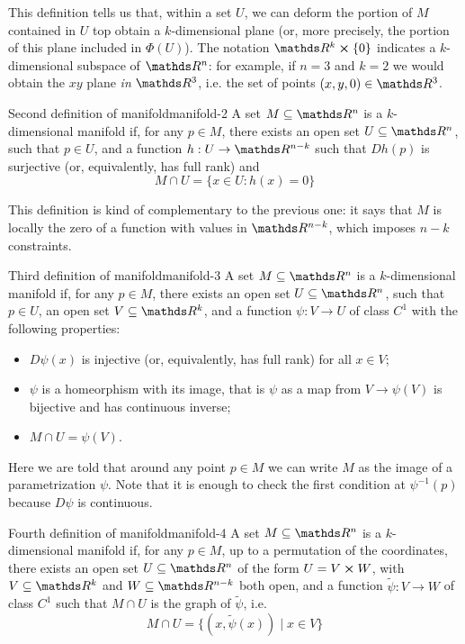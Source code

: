 \documentclass[12pt]{extarticle}
\begin{document}
This definition tells us that, within a set $U$, we can deform the portion of $M$ contained in $U$
top obtain a $k$-dimensional plane (or, more precisely, the portion of this plane included in
$\Phi(U)$).
The notation $\R^k \cross \{0\}$ indicates a $k$-dimensional subspace of $\R^n$: for example, if
$n = 3$ and $k = 2$ we would obtain the $xy$ plane \emph{in} $\R^3$, i.e. the set of points
$(x, y, 0) \in \R^3$.

\begin{definition}{Second definition of manifold}{manifold-2}
	A set $M \subseteq \R^n$ is a $k$-dimensional manifold if, for any $p \in M$, there exists an open
	set $U \subseteq \R^n$, such that $p \in U$, and a function $h: U \to \R^{n-k}$ such that $Dh(p)$
	is surjective (or, equivalently, has full rank) and
	\begin{equation}
		M \cap U = \{ x \in U : h(x) = 0 \}
	\end{equation}
\end{definition}

This definition is kind of complementary to the previous one: it says that $M$ is locally the zero
of a function with values in $\R^{n-k}$, which imposes $n-k$ constraints.

\begin{definition}{Third definition of manifold}{manifold-3}
	A set $M \subseteq \R^n$ is a $k$-dimensional manifold if, for any $p \in M$, there exists an open
	set $U \subseteq \R^n$, such that $p \in U$, an open set $V \subseteq \R^k$, and a function
	$\psi: V \to U$ of class $C^1$ with the following properties:
	\begin{itemize}
		\item $D \psi (x) $ is injective (or, equivalently, has full rank) for all $x \in V$;
		\item $\psi$ is a homeorphism with its image, that is $\psi$ as a map from $V \to \psi(V)$ is
		      bijective and has continuous inverse;
		\item $M \cap U = \psi(V)$.
	\end{itemize}
\end{definition}

Here we are told that around any point $p \in M$ we can write $M$ as the image of a parametrization
$\psi$. Note that it is enough to check the first condition at $\psi^{-1}(p)$ because $D\psi$ is
continuous.

\begin{definition}{Fourth definition of manifold}{manifold-4}
	A set $M \subseteq \R^n$ is a $k$-dimensional manifold if, for any $p \in M$, up to a permutation
	of the coordinates, there exists an open set $U \subseteq \R^n$ of the form $U = V \cross W$, with
	$V \subseteq \R^k$ and $W \subseteq \R^{n - k}$ both open, and a function $\tilde \psi: V \to W$
	of class $C^1$ such that $M \cap U$ is the graph of $\tilde \psi$, i.e.
	\begin{equation}
		M \cap U = \{ (x, \tilde \psi(x)) \mid x \in V\}
	\end{equation}
\end{definition}
\end{document}
